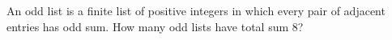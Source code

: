 An odd list is a finite list of positive integers in which every pair of adjacent entries has odd sum. How many odd lists have total sum $8$?
